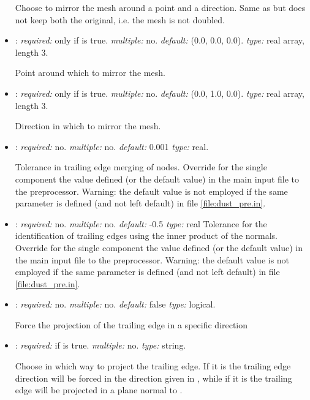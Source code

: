 \begin{itemize}
Choose to mirror the mesh around a point and a direction. Same as  but does not keep both the original, i.e. the mesh is not doubled.

\item {}: \textit{required:} only if  is true. \textit{multiple:} no. \textit{default:} (0.0, 0.0, 0.0). \textit{type:} real array, length 3.

Point around which to mirror the mesh.

\item {}: \textit{required:} only if  is true. \textit{multiple:} no. \textit{default:} (0.0, 1.0, 0.0). \textit{type:} real array, length 3.

Direction in which to mirror the mesh.

\item {}: \textit{required:} no. \textit{multiple:} no. \textit{default:} 0.001 \textit{type:} real.

Tolerance in trailing edge merging of nodes. Override for the single component the value defined (or the default value) in the main input file to the preprocessor. Warning: the default value is not employed if the same parameter is defined (and not left default) in file \ref{file:dust_pre.in}. 

\item {}: \textit{required:} no. \textit{multiple:} no. \textit{default:} -0.5 \textit{type:} real
Tolerance for the identification of trailing edges using the inner product of the normals.
Override for the single component the value defined (or the default value) in the main input file to the preprocessor. Warning: the default value is not employed if the same parameter is defined (and not left default) in file \ref{file:dust_pre.in}. 

\item {}: \textit{required:} no. \textit{multiple:} no. \textit{default:} false \textit{type:} logical.

Force the projection of the trailing edge in a specific direction

\item {}: \textit{required:} if  is true. \textit{multiple:} no. \textit{type:} string.

Choose in which way to project the trailing edge. If it is  the trailing edge direction will be forced in the direction given in , while if it is  the trailing edge will be projected in a plane normal to .


\end{itemize}
